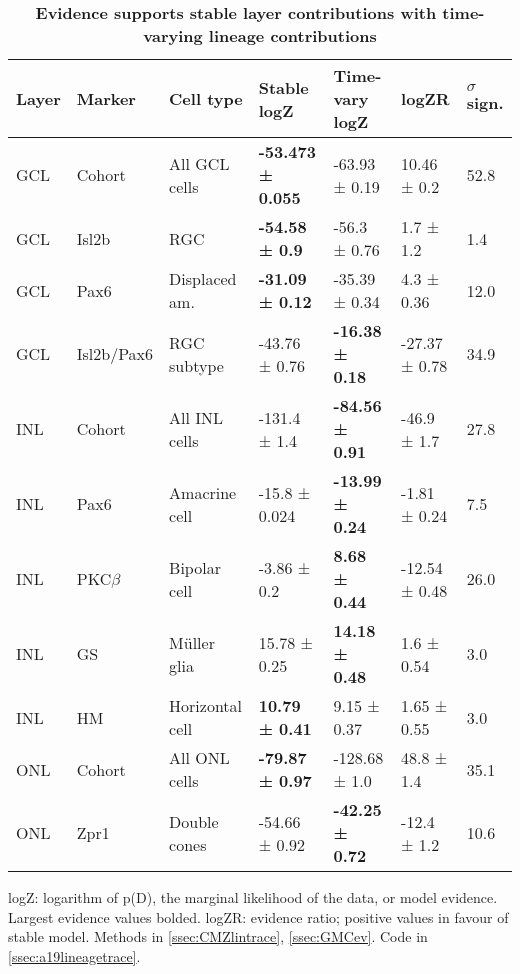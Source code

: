 \begin{table}[!ht]
    \caption{{\bf Evidence supports stable layer contributions with time-varying lineage contributions}}
    \begin{tabular}{|l|l|l|l|l|l|l|} 
        \hline
        {\bf Layer} & {\bf Marker} & {\bf Cell type} & {\bf Stable logZ} & {\bf Time-vary logZ} & {\bf logZR} & {\bf $\sigma$ sign.}\\ \hline \hline
        GCL & Cohort & All GCL cells & {\bf -53.473 ± 0.055} & -63.93 ± 0.19 & 10.46 ± 0.2 & 52.8\\ \hline \hline
        GCL & Isl2b & RGC & {\bf -54.58 ± 0.9} & -56.3 ± 0.76 & 1.7 ± 1.2 & 1.4\\ \hline
        GCL & Pax6 & Displaced am. & {\bf -31.09 ± 0.12} & -35.39 ± 0.34 & 4.3 ± 0.36 & 12.0\\ \hline
        GCL & Isl2b/Pax6 & RGC subtype & -43.76 ± 0.76 & {\bf -16.38 ± 0.18} & -27.37 ± 0.78 & 34.9\\ \hline \hline
        INL & Cohort & All INL cells & -131.4 ± 1.4 & {\bf -84.56 ± 0.91} & -46.9 ± 1.7 & 27.8\\ \hline \hline
        INL & Pax6 & Amacrine cell & -15.8 ± 0.024 & {\bf -13.99 ± 0.24} & -1.81 ± 0.24 & 7.5\\ \hline
        INL & PKC$\beta$ & Bipolar cell & -3.86 ± 0.2 & {\bf 8.68 ± 0.44} & -12.54 ± 0.48 & 26.0\\ \hline
        INL & GS & M\"{u}ller glia & 15.78 ± 0.25 & {\bf 14.18 ± 0.48} & 1.6 ± 0.54 & 3.0\\ \hline
        INL & HM & Horizontal cell & {\bf 10.79 ± 0.41} & 9.15 ± 0.37 & 1.65 ± 0.55 & 3.0\\ \hline \hline
        ONL & Cohort & All ONL cells & {\bf -79.87 ± 0.97} & -128.68 ± 1.0 & 48.8 ± 1.4 & 35.1\\ \hline \hline
        ONL & Zpr1 & Double cones & -54.66 ± 0.92 & {\bf -42.25 ± 0.72} & -12.4 ± 1.2 & 10.6\\ \hline
    \end{tabular}
   
    \begin{flushleft}logZ: logarithm of p(D), the marginal likelihood of the data, or model evidence.  Largest evidence values bolded. logZR: evidence ratio; positive values in favour of stable model.
    Methods in \autoref{ssec:CMZlintrace}, \autoref{ssec:GMCev}.
    Code in \autoref{ssec:a19lineagetrace}.    
    \end{flushleft}
    \label{lineage_ev}
\end{table}

